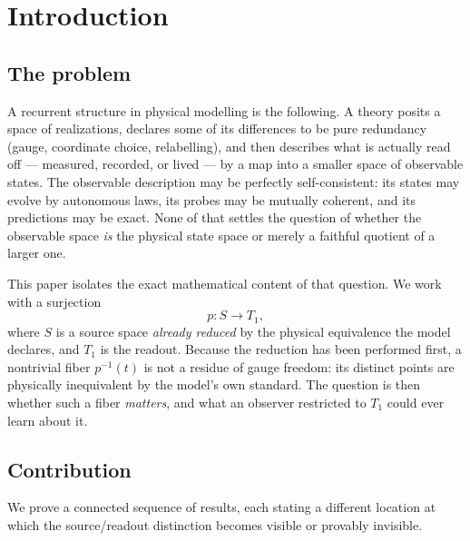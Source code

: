 \documentclass[11pt,reqno]{amsart}
\theoremstyle{plain}
\theoremstyle{definition}
\theoremstyle{remark}
\begin{document}
\maketitle

\section{Introduction}\label{sec:intro}

\subsection{The problem}

A recurrent structure in physical modelling is the following. A theory posits a space of realizations, declares some of its differences to be pure redundancy (gauge, coordinate choice, relabelling), and then describes what is actually read off --- measured, recorded, or lived --- by a map into a smaller space of observable states. The observable description may be perfectly self-consistent: its states may evolve by autonomous laws, its probes may be mutually coherent, and its predictions may be exact. None of that settles the question of whether the observable space \emph{is} the physical state space or merely a faithful quotient of a larger one.

This paper isolates the exact mathematical content of that question. We work with a surjection
\[
p\colon S\longrightarrow T_1,
\]
where $S$ is a source space \emph{already reduced} by the physical equivalence the model declares, and $T_1$ is the readout. Because the reduction has been performed first, a nontrivial fiber $p^{-1}(t)$ is not a residue of gauge freedom: its distinct points are physically inequivalent by the model's own standard. The question is then whether such a fiber \emph{matters}, and what an observer restricted to $T_1$ could ever learn about it.

\subsection{Contribution}

We prove a connected sequence of results, each stating a different location at which the source/readout distinction becomes visible or provably invisible.
\end{document}

